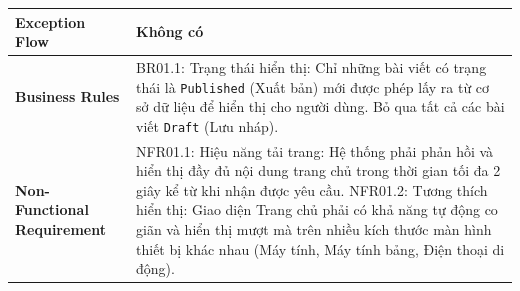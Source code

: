 \documentclass[a4paper,12pt]{article}
\begin{document}
\begin{longtable}{|p{4cm}|p{11.5cm}|}
\textbf{Exception Flow} & 
Không có \\ \hline
\textbf{Business Rules} & 
BR01.1: Trạng thái hiển thị: Chỉ những bài viết có trạng thái là \texttt{Published} (Xuất bản) mới được phép lấy ra từ cơ sở dữ liệu để hiển thị cho người dùng. Bỏ qua tất cả các bài viết \texttt{Draft} (Lưu nháp). \\ \hline
\textbf{Non-Functional Requirement} & 
NFR01.1: Hiệu năng tải trang: Hệ thống phải phản hồi và hiển thị đầy đủ nội dung trang chủ trong thời gian tối đa 2 giây kể từ khi nhận được yêu cầu. \newline
NFR01.2: Tương thích hiển thị: Giao diện Trang chủ phải có khả năng tự động co giãn và hiển thị mượt mà trên nhiều kích thước màn hình thiết bị khác nhau (Máy tính, Máy tính bảng, Điện thoại di động). \\ \hline
\end{longtable}
\end{document}
